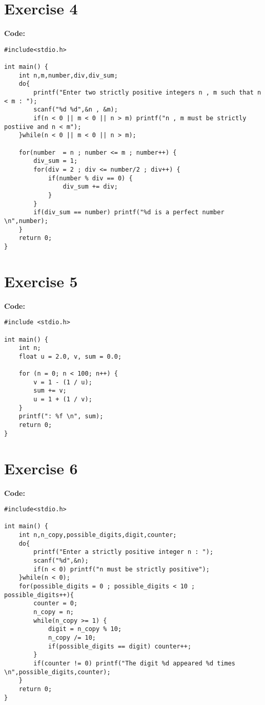 \documentclass[12pt]{article}
\begin{document}
\section*{Exercise 4}
\vspace{0.5cm}

\textbf{Code:}
\begin{lstlisting}
#include<stdio.h>

int main() {
	int n,m,number,div,div_sum;
	do{
		printf("Enter two strictly positive integers n , m such that n < m : ");
		scanf("%d %d",&n , &m);
		if(n < 0 || m < 0 || n > m) printf("n , m must be strictly postiive and n < m");
	}while(n < 0 || m < 0 || n > m);
	
	for(number  = n ; number <= m ; number++) {
		div_sum = 1;
		for(div = 2 ; div <= number/2 ; div++) {
			if(number % div == 0) {
				div_sum += div;
			}
		}
		if(div_sum == number) printf("%d is a perfect number \n",number);
	}
	return 0;
}
\end{lstlisting}
\vspace{1cm}
\section*{Exercise 5}
\vspace{0.5cm}

\textbf{Code:}
\begin{lstlisting}
#include <stdio.h>

int main() {
	int n;
	float u = 2.0, v, sum = 0.0;
	
	for (n = 0; n < 100; n++) {
		v = 1 - (1 / u);   
		sum += v;        
		u = 1 + (1 / v);    
	}
	printf(": %f \n", sum);
	return 0;
}
\end{lstlisting}
\vspace{1cm}
\section*{Exercise 6}
\vspace{0.5cm}

\textbf{Code:} 
\begin{lstlisting}
#include<stdio.h> 

int main() {
	int n,n_copy,possible_digits,digit,counter;
	do{
		printf("Enter a strictly positive integer n : ");
		scanf("%d",&n);
		if(n < 0) printf("n must be strictly positive");
	}while(n < 0);
	for(possible_digits = 0 ; possible_digits < 10 ; possible_digits++){
		counter = 0;
		n_copy = n;
		while(n_copy >= 1) {
			digit = n_copy % 10;
			n_copy /= 10;
			if(possible_digits == digit) counter++;
		}
		if(counter != 0) printf("The digit %d appeared %d times \n",possible_digits,counter);
	}
	return 0;
}
\end{lstlisting}
\vspace{1cm}
\end{document}
